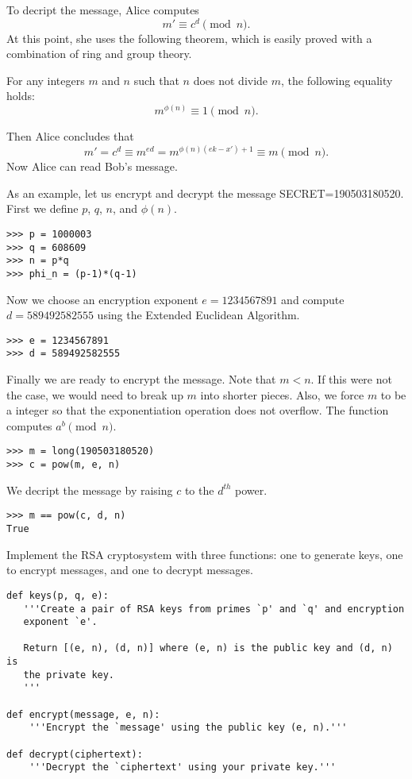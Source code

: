 To decript the message, Alice computes
\[
m' \equiv c^d \pmod{n}.
\]
At this point, she uses the following theorem, which is easily proved with a combination of ring and group theory.
\begin{theorem}
For any integers $m$ and $n$ such that $n$ does not divide $m$, the following equality holds:
\[
m^{\phi(n)}\equiv 1 \pmod{n}.
\]
\end{theorem}
Then Alice concludes that
\[
m' = c^d \equiv m^{ed} = m^{\phi(n)(ek-x')+1} \equiv m \pmod{n}.
\]
Now Alice can read Bob's message.

As an example, let us encrypt and decrypt the message SECRET=190503180520.
First we define $p$, $q$, $n$, and $\phi(n)$.
\begin{lstlisting}
>>> p = 1000003
>>> q = 608609
>>> n = p*q
>>> phi_n = (p-1)*(q-1)
\end{lstlisting}

Now we choose an encryption exponent $e = 1234567891$ and compute $d = 589492582555$ using the Extended Euclidean Algorithm.
\begin{lstlisting}
>>> e = 1234567891
>>> d = 589492582555
\end{lstlisting}

Finally we are ready to encrypt the message. 
Note that $m<n$. If this were not the case, we would need to break up $m$ into shorter pieces.
Also, we force $m$ to be a  integer so that the exponentiation operation does not overflow.
The function  computes $a^b \pmod{n}$.
\begin{lstlisting}
>>> m = long(190503180520)
>>> c = pow(m, e, n)
\end{lstlisting}

We decript the message by raising $c$ to the $d^{th}$ power.
\begin{lstlisting}
>>> m == pow(c, d, n)
True
\end{lstlisting}

\begin{problem}
Implement the RSA cryptosystem with three functions: one to generate keys, one to encrypt messages, and one to decrypt messages.
\begin{lstlisting}
def keys(p, q, e):
   '''Create a pair of RSA keys from primes `p' and `q' and encryption 
   exponent `e'.
   
   Return [(e, n), (d, n)] where (e, n) is the public key and (d, n) is 
   the private key.
   '''
    
def encrypt(message, e, n):
    '''Encrypt the `message' using the public key (e, n).'''
    
def decrypt(ciphertext):
    '''Decrypt the `ciphertext' using your private key.'''
\end{lstlisting}
\label{prob:rsa1}
\end{problem}
